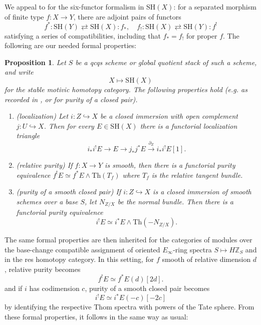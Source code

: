 \documentclass[a4paper,reqno,11pt]{amsart}
\theoremstyle{plain}
\newtheorem{proposition}[theorem]{Proposition}
\theoremstyle{definition}
\theoremstyle{remark}
\newcommand{\Z}{\mathbb{Z}}
\newcommand{\SH}{\mathrm{SH}}
\begin{document}
We appeal to \cite{Hoy} for the six-functor formalism in $\SH(X)$: for a separated morphism of finite type $f:X\to Y$, there are adjoint pairs of functors
    \[
    f^*:\SH(Y) \rightleftarrows \SH(X): f_*,\quad f_!: \SH(X) \rightleftarrows \SH(Y): f^!
    \]
satisfying a series of compatibilities, including that $f_*=f_!$ for proper $f$. The following are our needed formal properties:

\begin{proposition}
Let $S$ be a qcqs scheme or global quotient stack of such a scheme, and write
\[
X\longmapsto \SH(X)
\]
for the stable motivic homotopy category. The following properties hold (e.g. as recorded in \cite[Theorem 6.18]{Hoy}, or \cite[Theorem 3.2.23]{MV} for purity of a closed pair).

\begin{enumerate}
    \item \textup{(localization)}
    Let $i:Z\hookrightarrow X$ be a closed immersion with open complement $j:U\hookrightarrow X$. Then for every $E\in \SH(X)$ there is a functorial localization triangle
    \[
    i_*i^!E\longrightarrow E\longrightarrow j_*j^*E
    \xrightarrow{\partial_Z}
    i_*i^!E[1].
    \]
    \item \textup{(relative purity)}
    If $f:X\to Y$ is smooth, then there is a functorial purity equivalence $f^!E\simeq f^*E\wedge \mathrm{Th}(T_f)$ where $T_f$ is the relative tangent bundle.

    \item \textup{(purity of a smooth closed pair)}
    If $i:Z\hookrightarrow X$ is a closed immersion of smooth schemes over a base $S$, let $N_{Z/X}$ be the normal bundle. Then there is a functorial purity equivalence
    \[
    i^!E\simeq i^*E\wedge \mathrm{Th}(-N_{Z/X}).
    \]
    \end{enumerate}
\end{proposition}
The same formal properties are then inherited for the categories of modules over the base-change compatible assignment of oriented $E_\infty$-ring spectra $S\mapsto H\Z_S$ and in the res homotopy category. In this setting, for $f$ smooth of relative dimension $d$, relative purity becomes
    \[
    f^!E\simeq f^*E(d)[2d].
    \]
and if $i$ has codimension $c$, purity of a smooth closed pair becomes
    \[
    i^!E\simeq i^*E(-c)[-2c]
    \]
by identifying the respective Thom spectra with powers of the Tate sphere. From these formal properties, it follows in the same way as usual:
\end{document}
